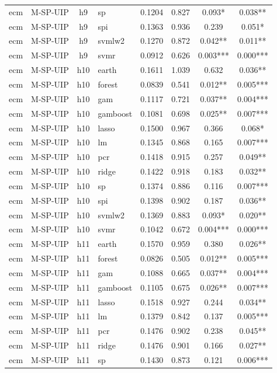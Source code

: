 \begin{ThreePartTable}
\begin{longtable}[t]{llclcccc}
ecm & M-SP-UIP & h9 & sp & 0.1204 & 0.827 & 0.093* & 0.038**\\
ecm & M-SP-UIP & h9 & spi & 0.1363 & 0.936 & 0.239 & 0.051*\\
ecm & M-SP-UIP & h9 & svmlw2 & 0.1270 & 0.872 & 0.042** & 0.011**\\
ecm & M-SP-UIP & h9 & svmr & 0.0912 & 0.626 & 0.003*** & 0.000***\\
\addlinespace
ecm & M-SP-UIP & h10 & earth & 0.1611 & 1.039 & 0.632 & 0.036**\\
ecm & M-SP-UIP & h10 & forest & 0.0839 & 0.541 & 0.012** & 0.005***\\
ecm & M-SP-UIP & h10 & gam & 0.1117 & 0.721 & 0.037** & 0.004***\\
ecm & M-SP-UIP & h10 & gamboost & 0.1081 & 0.698 & 0.025** & 0.007***\\
ecm & M-SP-UIP & h10 & lasso & 0.1500 & 0.967 & 0.366 & 0.068*\\
ecm & M-SP-UIP & h10 & lm & 0.1345 & 0.868 & 0.165 & 0.007***\\
ecm & M-SP-UIP & h10 & pcr & 0.1418 & 0.915 & 0.257 & 0.049**\\
ecm & M-SP-UIP & h10 & ridge & 0.1422 & 0.918 & 0.183 & 0.032**\\
ecm & M-SP-UIP & h10 & sp & 0.1374 & 0.886 & 0.116 & 0.007***\\
ecm & M-SP-UIP & h10 & spi & 0.1398 & 0.902 & 0.187 & 0.036**\\
ecm & M-SP-UIP & h10 & svmlw2 & 0.1369 & 0.883 & 0.093* & 0.020**\\
ecm & M-SP-UIP & h10 & svmr & 0.1042 & 0.672 & 0.004*** & 0.000***\\
\addlinespace
ecm & M-SP-UIP & h11 & earth & 0.1570 & 0.959 & 0.380 & 0.026**\\
ecm & M-SP-UIP & h11 & forest & 0.0826 & 0.505 & 0.012** & 0.005***\\
ecm & M-SP-UIP & h11 & gam & 0.1088 & 0.665 & 0.037** & 0.004***\\
ecm & M-SP-UIP & h11 & gamboost & 0.1105 & 0.675 & 0.026** & 0.007***\\
ecm & M-SP-UIP & h11 & lasso & 0.1518 & 0.927 & 0.244 & 0.034**\\
ecm & M-SP-UIP & h11 & lm & 0.1379 & 0.842 & 0.137 & 0.005***\\
ecm & M-SP-UIP & h11 & pcr & 0.1476 & 0.902 & 0.238 & 0.045**\\
ecm & M-SP-UIP & h11 & ridge & 0.1476 & 0.901 & 0.166 & 0.027**\\
ecm & M-SP-UIP & h11 & sp & 0.1430 & 0.873 & 0.121 & 0.006***\\

\end{longtable}
\end{ThreePartTable}
